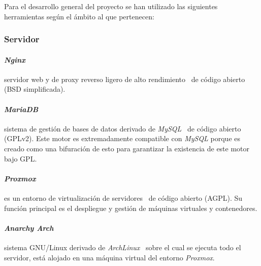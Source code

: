 Para el desarrollo general del proyecto se han utilizado las siguientes herramientas según el ámbito al que pertenecen:

\subsubsection{Servidor}
\paragraph{\textit{Nginx}}servidor web y de proxy reverso ligero de alto rendimiento~\cite{wiki:nginx} de código abierto (BSD simplificada).
\paragraph{\textit{MariaDB}}sistema de gestión de bases de datos derivado de \textit{MySQL}~\cite{wiki:mariadb} de código abierto (GPLv2). Este motor es extremadamente compatible con \textit{MySQL} porque es creado como una bifuración de esto para garantizar la existencia de este motor bajo GPL.
\paragraph{\textit{Proxmox}}es un entorno de virtualización de servidores~\cite{wiki:proxmox} de código abierto (AGPL). Su función principal es el despliegue y gestión de máquinas virtuales y contenedores.
\paragraph{\textit{Anarchy Arch}}sistema GNU/Linux derivado de \textit{ArchLinux}~\cite{wiki:arch} sobre el cual se ejecuta todo el servidor, está alojado en una máquina virtual del entorno \textit{Proxmox}.

